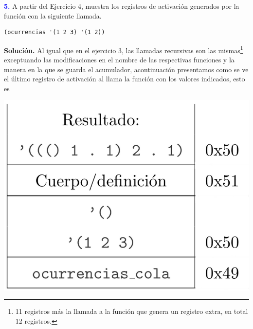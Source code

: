 \textbf{\textcolor{blue}{5.}} \Large
A partir del Ejercicio 4, muestra los registros de activación generados por la función con
la siguiente llamada.
\begin{lstlisting}
(ocurrencias '(1 2 3) '(1 2))
\end{lstlisting}

\textbf{Solución.} Al igual que en el ejercicio 3, las llamadas recursivas son las mismas\footnote{11 registros
más la llamada a la función  que genera un registro extra, en total 12 registros.}
exceptuando las modificaciones en el nombre de las respectivas funciones y la manera en la que se guarda el acumulador,
acontinuación presentamos como se ve el último registro de activación al llama la función con los valores indicados, esto es
                   

\begin{center}
        \includegraphics[scale=0.25]{./Ultimo}
\end{center}
